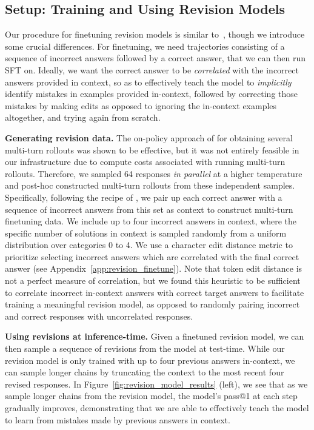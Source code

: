 \documentclass[11pt, letterpaper, logo]{googledeepmind}
\begin{document}
\vspace{-0.3cm}
\subsection{Setup: Training and Using Revision Models}
\label{sec:revision_setup}
\vspace{-0.2cm}
Our procedure for finetuning revision models is similar to~\citep{qu2024recursive}, though we introduce some crucial differences.
For finetuning, we need trajectories consisting of a sequence of incorrect answers followed by a correct answer, that we can then run SFT on. Ideally, we want the correct answer to be \emph{correlated} with the incorrect answers provided in context, so as to effectively teach the model to \emph{implicitly} identify mistakes in examples provided in-context, followed by correcting those mistakes by making edits as opposed to ignoring the in-context examples altogether, and trying again from scratch.

\textbf{Generating revision data.} The on-policy approach of \citet{qu2024recursive} for obtaining several multi-turn rollouts was shown to be effective, but it was not entirely feasible in our infrastructure due to compute costs associated with running multi-turn rollouts. Therefore, we sampled 64 responses \emph{in parallel} at a higher temperature and post-hoc constructed multi-turn rollouts from these independent samples. Specifically, following the recipe of \citep{anonymousrevisions}, we pair up each correct answer  with a sequence of incorrect answers from this set as context to construct multi-turn finetuning data.
We include up to four incorrect answers in context, where the specific number of solutions in context is sampled randomly from a uniform distribution over categories 0 to 4. We use a character edit distance metric to prioritize selecting incorrect answers which are correlated with the final correct answer (see Appendix~\ref{app:revision_finetune}). Note that token edit distance is not a perfect measure of correlation, but we found this heuristic to be sufficient to correlate incorrect in-context answers with correct target answers to facilitate training a meaningful revision model, as opposed to randomly pairing incorrect and correct responses with uncorrelated responses.

\textbf{Using revisions at inference-time.} Given a finetuned revision model, we can then sample a sequence of revisions from the model at test-time. While our revision model is only trained with up to four previous answers in-context, we can sample longer chains by truncating the context to the most recent four revised responses. In Figure~\ref{fig:revision_model_results} (left), we see that as we sample longer chains from the revision model, the model's pass@1 at each step gradually improves, demonstrating that we are able to effectively teach the model to learn from mistakes made by previous answers in context.
\end{document}
